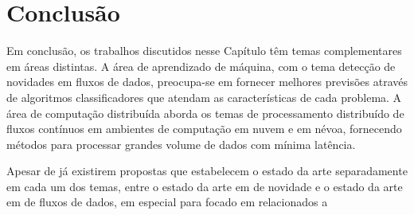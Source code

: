 \newcommand{\stream}{\emph{data stream}\xspace}
\newcommand{\streams}{\emph{data streams}\xspace}
\newcommand{\streamMining}{\emph{data stream mining}\xspace}

\section{Conclusão}\label{sec:conclusao-relacionados}


Em conclusão, os trabalhos discutidos nesse Capítulo têm temas complementares em
áreas distintas.
A área de aprendizado de máquina, com o tema detecção de novidades em fluxos de
dados, preocupa-se em fornecer melhores previsões através de algoritmos
classificadores que atendam as características de cada problema.
A área de computação distribuída aborda os temas de processamento distribuído
de fluxos contínuos em ambientes de computação em nuvem e em névoa, fornecendo
métodos para processar grandes volume de dados com mínima latência.

Apesar de já existirem propostas que estabelecem o estado da arte separadamente
em cada um dos temas,  entre o
estado da arte em  de novidade e o estado da arte em
 de fluxos de dados, em especial para  focado em  relacionados a 

